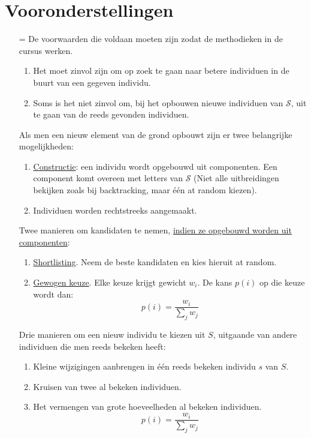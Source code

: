 \documentclass{report}
\begin{document}
\section{Vooronderstellingen}
\begin{itemize}
	\item[=] De voorwaarden die voldaan moeten zijn zodat de methodieken in de cursus werken.
	\begin{enumerate}
		\item Het moet zinvol zijn om op zoek te gaan naar betere individuen in de buurt van een gegeven individu. 
		\item Soms is het niet zinvol om, bij het opbouwen nieuwe individuen van $\mathcal{S}$, uit te gaan van de reeds gevonden individuen. 
	\end{enumerate}
	\item[\info] Als men een nieuw element van de grond opbouwt zijn er twee belangrijke mogelijkheden:
	\begin{enumerate}
		\item \underline{Constructie}: een individu wordt opgebouwd uit componenten. Een component komt overeen met letters van $\mathcal{S}$ (Niet alle uitbreidingen bekijken zoals bij backtracking, maar één at random kiezen).
		\item Individuen worden rechtstreeks aangemaakt.
	\end{enumerate}
	\item[\info] Twee manieren om kandidaten te nemen, \underline{indien ze opgebouwd worden uit componenten}:
	\begin{enumerate}
		\item \underline{Shortlisting}. Neem de beste kandidaten en kies hieruit at random.
		\item \underline{Gewogen keuze}. Elke keuze krijgt gewicht $w_i$. De kans $p(i)$ op die keuze wordt dan:
		$$p(i) = \frac{w_i}{\sum_j w_j}$$

	\end{enumerate}
	\item[\info] Drie manieren om een nieuw individu te kiezen uit $S$, uitgaande van andere individuen die men reeds bekeken heeft:
	\begin{enumerate}
		\item Kleine wijzigingen aanbrengen in één reeds bekeken individu $s$ van $S$.
		\item Kruisen van twee al bekeken individuen.
		\item Het vermengen van grote hoeveelheden al bekeken individuen.
		$$p(i) = \frac{w_i}{\sum_j w_j}$$
	\end{enumerate}

\end{itemize}
\end{document}
